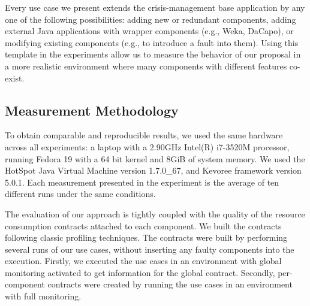 Every use case we present extends the crisis-management base application by any one of the following possibilities: adding new or redundant components, adding external Java applications with wrapper components (e.g., Weka, DaCapo), or modifying existing components (e.g., to introduce a fault into them).
Using this template in the experiments allow us to measure the behavior of our proposal in a more realistic environment where many components with different features co-exist.

\subsection{Measurement Methodology} \label{sec:measurement_metodology}
To obtain comparable and reproducible results, we used the same hardware across all experiments: a laptop with a 2.90GHz Intel(R) i7-3520M processor, running Fedora 19 with a 64 bit kernel and 8GiB of system memory.
We used the HotSpot Java Virtual Machine version 1.7.0\_67, and Kevoree framework version 5.0.1.
Each measurement presented in the experiment is the average of ten different runs under the same conditions. 

The evaluation of our approach is tightly coupled with the quality of the resource consumption contracts attached to each component.
We built the contracts following classic profiling techniques. 
The contracts were built by performing several runs of our use cases, without inserting any faulty components into the execution.
Firstly, we executed the use cases in an environment with global monitoring activated to get information for the global contract.
Secondly, per-component contracts were created by running the use cases in an environment with full monitoring.

